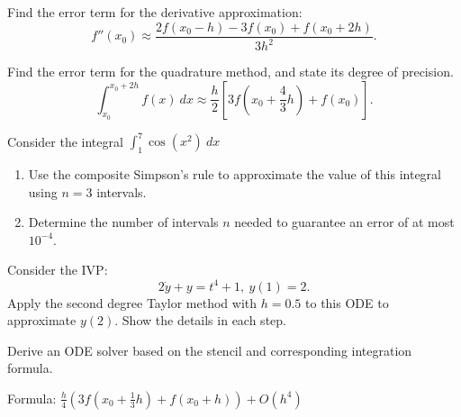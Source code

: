 \documentclass{eh-homework}
\begin{document}
    \begin{question}{1}
        Find the error term for the derivative approximation:
        \[
            f''(x_0) \approx \frac{2f(x_0 - h) - 3f(x_0) + f(x_0 + 2h)}{3h^2}.
        \]
    \end{question}
    \begin{question}{2}
        Find the error term for the quadrature method, and state its degree of precision.
        \[
            \int _{x_0}^{x_0 + 2h}f(x)\ dx \approx \frac{h}{2}\left[ 3f \left( x_0 + \frac{4}{3}h \right) + f(x_0) \right].
        \]
    \end{question}
    \begin{question}{3}
        Consider the integral \(\int _1^7 \cos (x^2)\ dx\)
        \begin{enumerate}[label=(\alph*)]
            \item Use the composite Simpson's rule to approximate the value of this integral using \(n=3\) intervals.
            \item Determine the number of intervals \(n\) needed to guarantee an error of at most \(10^{-4}\).
        \end{enumerate}
    \end{question}
    \begin{question}{4}
        Consider the IVP:
        \[
            2\dot y + y = t^4 + 1,\ y(1) = 2.
        \]
        Apply the second degree Taylor method with \(h = 0.5\) to this ODE to approximate \(y(2)\). Show the details in each step.
    \end{question}
    \begin{question}{5}
        Derive an ODE solver based on the stencil and corresponding integration formula.

        Formula: \(\frac{h}{4}\left( 3f \left( x_0 + \frac{1}{3}h \right) + f(x_0 + h) \right) + O (h^4)\) 
    \end{question}
\end{document}
